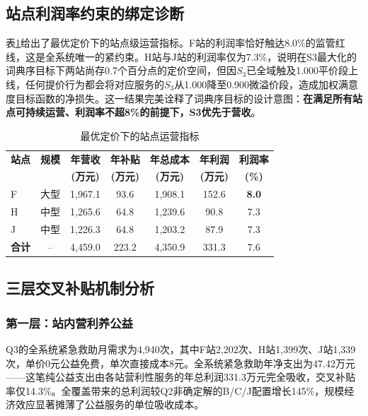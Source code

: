 \subsection{站点利润率约束的绑定诊断}

表\ref{tab:q3_stations}给出了最优定价下的站点级运营指标。F站的利润率恰好触达8.0\%的监管红线，这是全系统唯一的紧约束。H站与J站的利润率仅为7.3\%，说明在S3最大化的词典序目标下两站尚存0.7个百分点的定价空间，但因$S_3$已全域触及1.000平价段上线，任何提价行为都会将对应服务的$S_3$从1.000降至0.900微溢价段，造成加权满意度目标函数的净损失。这一结果完美诠释了词典序目标的设计意图：\textbf{在满足所有站点可持续运营、利润率不超8\%的前提下，S3优先于营收}。

\begin{table}[htbp]
\centering
\caption{最优定价下的站点运营指标}
\label{tab:q3_stations}
\small
\begin{tabular}{lcccccc}
\toprule
\textbf{站点} & \textbf{规模} & \textbf{年营收} & \textbf{年补贴} & \textbf{年总成本} & \textbf{年利润} & \textbf{利润率} \\
 &  & \textbf{(万元)} & \textbf{(万元)} & \textbf{(万元)} & \textbf{(万元)} & \textbf{(\%)} \\
\midrule
F & 大型 & 1,967.1 & 93.6 & 1,908.1 & 152.6 & \textbf{8.0} \\
H & 中型 & 1,265.6 & 64.8 & 1,239.6 & 90.8 & 7.3 \\
J & 中型 & 1,226.3 & 64.8 & 1,203.2 & 87.9 & 7.3 \\
\midrule
\textbf{合计} & -- & 4,459.0 & 223.2 & 4,350.9 & 331.3 & 7.6 \\
\bottomrule
\end{tabular}
\end{table}

\subsection{三层交叉补贴机制分析}

\subsubsection{第一层：站内营利养公益}

Q3的全系统紧急救助月需求为4,940次，其中F站2,202次、H站1,399次、J站1,339次，单价0元公益免费，单次直接成本8元。全系统紧急救助年净支出为47.42万元——这笔纯公益支出由各站营利性服务的年总利润331.3万元完全吸收，交叉补贴率仅14.3\%。全覆盖带来的总利润较Q2非确定解的B/C/J配置增长145\%，规模经济效应显著摊薄了公益服务的单位吸收成本。

